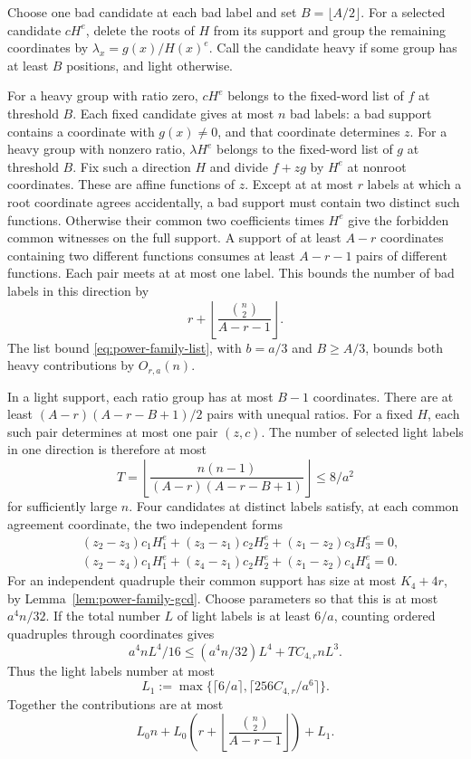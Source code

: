 Choose one bad candidate at each bad label and set $B=\lfloor A/2\rfloor$.
For a selected candidate $cH^e$, delete the roots of $H$ from its
support and group the remaining coordinates by $\lambda_x=g(x)/H(x)^e$.
Call the candidate heavy if some group has at least $B$ positions,
and light otherwise.

For a heavy group with ratio zero, $cH^e$ belongs to the fixed-word
list of $f$ at threshold $B$. Each fixed candidate gives at most $n$
bad labels: a bad support contains a coordinate with $g(x)\ne0$, and
that coordinate determines $z$.
For a heavy group with nonzero ratio, $\lambda H^e$ belongs to the
fixed-word list of $g$ at threshold $B$. Fix such a direction $H$ and
divide $f+zg$ by $H^e$ at nonroot coordinates. These are affine
functions of $z$. Except at at most $r$ labels at which a root coordinate
agrees accidentally, a bad support must contain two distinct such
functions. Otherwise their common two coefficients times $H^e$ give
the forbidden common witnesses on the full support. A support of at
least $A-r$ coordinates containing two different functions consumes
at least $A-r-1$ pairs of different functions. Each pair meets at at
most one label. This bounds the number of bad labels in this direction by
\[
 r+\left\lfloor\frac{\binom n2}{A-r-1}\right\rfloor.
\]
The list bound \eqref{eq:power-family-list}, with $b=a/3$ and
$B\ge A/3$, bounds both heavy contributions by $O_{r,a}(n)$.

In a light support, each ratio group has at most $B-1$ coordinates.
There are at least $(A-r)(A-r-B+1)/2$ pairs with unequal ratios.
For a fixed $H$, each such pair determines at most one pair $(z,c)$.
The number of selected light labels in one direction is therefore at most
\[
 T=\left\lfloor\frac{n(n-1)}{(A-r)(A-r-B+1)}\right\rfloor
 \le 8/a^2
\]
for sufficiently large $n$. Four candidates at distinct labels satisfy,
at each common agreement coordinate, the two independent forms
\begin{align*}
 &(z_2-z_3)c_1H_1^e+(z_3-z_1)c_2H_2^e+(z_1-z_2)c_3H_3^e=0,\\
 &(z_2-z_4)c_1H_1^e+(z_4-z_1)c_2H_2^e+(z_1-z_2)c_4H_4^e=0.
\end{align*}
For an independent quadruple their common support has size at most
$K_4+4r$, by Lemma~\ref{lem:power-family-gcd}.
Choose parameters so that this is at most $a^4n/32$.
If the total number $L$ of light labels is at least $6/a$, counting
ordered quadruples through coordinates gives
\[
 a^4nL^4/16\le (a^4n/32)L^4+TC_{4,r}nL^3.
\]
Thus the light labels number at most
\[
 L_1:=\max\{\lceil6/a\rceil,\lceil256C_{4,r}/a^6\rceil\}.
\]
Together the contributions are at most
\begin{equation}\label{eq:power-family-finite}
 L_0n+L_0\left(r+\left\lfloor\frac{\binom n2}{A-r-1}\right\rfloor\right)+L_1.
\end{equation}

